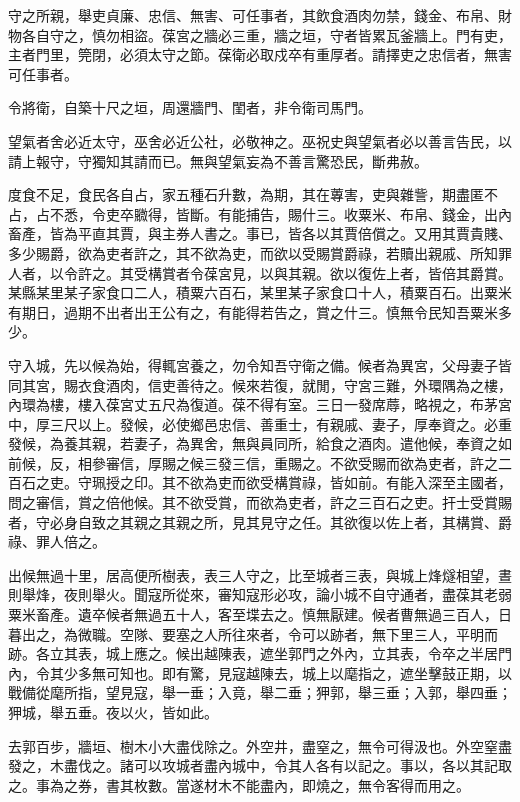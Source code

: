 \begin{pinyinscope}
守之所親，舉吏貞廉、忠信、無害、可任事者，其飲食酒肉勿禁，錢金、布帛、財物各自守之，慎勿相盜。葆宮之牆必三重，牆之垣，守者皆累瓦釜牆上。門有吏，主者門里，筦閉，必須太守之節。葆衛必取戍卒有重厚者。請擇吏之忠信者，無害可任事者。

令將衛，自築十尺之垣，周還牆門、閨者，非令衛司馬門。

望氣者舍必近太守，巫舍必近公社，必敬神之。巫祝史與望氣者必以善言告民，以請上報守，守獨知其請而已。無與望氣妄為不善言驚恐民，斷弗赦。

度食不足，食民各自占，家五種石升數，為期，其在蓴害，吏與雜訾，期盡匿不占，占不悉，令吏卒覹得，皆斷。有能捕告，賜什三。收粟米、布帛、錢金，出內畜產，皆為平直其賈，與主券人書之。事已，皆各以其賈倍償之。又用其賈貴賤、多少賜爵，欲為吏者許之，其不欲為吏，而欲以受賜賞爵祿，若贖出親戚、所知罪人者，以令許之。其受構賞者令葆宮見，以與其親。欲以復佐上者，皆倍其爵賞。某縣某里某子家食口二人，積粟六百石，某里某子家食口十人，積粟百石。出粟米有期日，過期不出者出王公有之，有能得若告之，賞之什三。慎無令民知吾粟米多少。

守入城，先以候為始，得輒宮養之，勿令知吾守衛之備。候者為異宮，父母妻子皆同其宮，賜衣食酒肉，信吏善待之。候來若復，就閒，守宮三難，外環隅為之樓，內環為樓，樓入葆宮丈五尺為復道。葆不得有室。三日一發席蓐，略視之，布茅宮中，厚三尺以上。發候，必使鄉邑忠信、善重士，有親戚、妻子，厚奉資之。必重發候，為養其親，若妻子，為異舍，無與員同所，給食之酒肉。遣他候，奉資之如前候，反，相參審信，厚賜之候三發三信，重賜之。不欲受賜而欲為吏者，許之二百石之吏。守珮授之印。其不欲為吏而欲受構賞祿，皆如前。有能入深至主國者，問之審信，賞之倍他候。其不欲受賞，而欲為吏者，許之三百石之吏。扞士受賞賜者，守必身自致之其親之其親之所，見其見守之任。其欲復以佐上者，其構賞、爵祿、罪人倍之。

出候無過十里，居高便所樹表，表三人守之，比至城者三表，與城上烽燧相望，晝則舉烽，夜則舉火。聞寇所從來，審知寇形必攻，論小城不自守通者，盡葆其老弱粟米畜產。遺卒候者無過五十人，客至堞去之。慎無厭建。候者曹無過三百人，日暮出之，為微職。空隊、要塞之人所往來者，令可以跡者，無下里三人，平明而跡。各立其表，城上應之。候出越陳表，遮坐郭門之外內，立其表，令卒之半居門內，令其少多無可知也。即有驚，見寇越陳去，城上以麾指之，遮坐擊鼓正期，以戰備從麾所指，望見寇，舉一垂；入竟，舉二垂；狎郭，舉三垂；入郭，舉四垂；狎城，舉五垂。夜以火，皆如此。

去郭百步，牆垣、樹木小大盡伐除之。外空井，盡窒之，無令可得汲也。外空窒盡發之，木盡伐之。諸可以攻城者盡內城中，令其人各有以記之。事以，各以其記取之。事為之券，書其枚數。當遂材木不能盡內，即燒之，無令客得而用之。


\end{pinyinscope}
